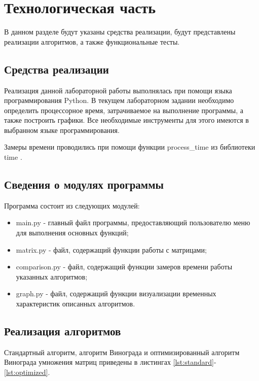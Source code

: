 \chapter{Технологическая часть}

В данном разделе будут указаны средства реализации, будут представлены реализации алгоритмов, а также функциональные тесты.

\section{Средства реализации}

Реализация данной лабораторной работы выполнялась при помощи языка программирования Python.  В текущем лабораторном задании необходимо определить процессорное время, затрачиваемое на выполнение программы, а также построить графики. Все необходимые инструменты для этого имеются в выбранном
языке программирования\cite{python}.

Замеры времени проводились при помощи функции process\_time из библиотеки time \cite{python-time}.

\section{Сведения о модулях программы}

Программа состоит из следующих модулей:

\begin{itemize}
	\item main.py - главный файл программы, предоставляющий пользователю меню для выполнения основных функций;
	\item matrix.py - файл, содержащий функции работы с матрицами;
	\item comparison.py - файл, содержащий функции замеров времени работы указанных алгоритмов;
	\item graph.py - файл, содержащий функции визуализации временных характеристик описанных алгоритмов.
\end{itemize}

\section{Реализация алгоритмов}

Стандартный алгоритм, алгоритм Винограда и оптимизированный алгоритм Винограда умножения матриц приведены в листингах \ref{lst:standard}-\ref{lst:optimized}.

